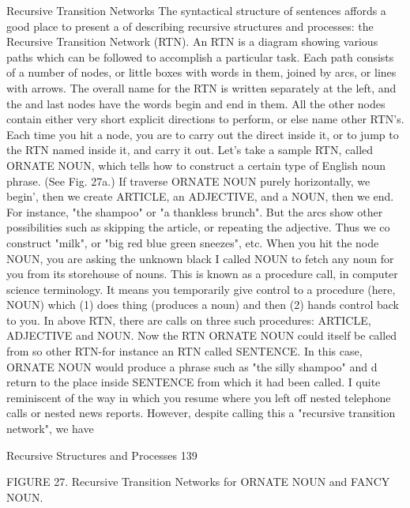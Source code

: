                           Recursive Transition Networks
The syntactical structure of sentences affords a good place to present a of describing
recursive structures and processes: the Recursive Transition Network (RTN). An RTN is
a diagram showing various paths which can be followed to accomplish a particular task.
Each path consists of a number of nodes, or little boxes with words in them, joined by
arcs, or lines with arrows. The overall name for the RTN is written separately at the left,
and the and last nodes have the words begin and end in them. All the other nodes contain
either very short explicit directions to perform, or else name other RTN's. Each time you
hit a node, you are to carry out the direct inside it, or to jump to the RTN named inside it,
and carry it out.
        Let's take a sample RTN, called ORNATE NOUN, which tells how to construct
a certain type of English noun phrase. (See Fig. 27a.) If traverse ORNATE NOUN
purely horizontally, we begin', then we create ARTICLE, an ADJECTIVE, and a
NOUN, then we end. For instance, "the shampoo" or "a thankless brunch". But the arcs
show other possibilities such as skipping the article, or repeating the adjective. Thus we
co construct "milk", or "big red blue green sneezes", etc.
        When you hit the node NOUN, you are asking the unknown black I called NOUN
to fetch any noun for you from its storehouse of nouns. This is known as a procedure
call, in computer science terminology. It means you temporarily give control to a
procedure (here, NOUN) which (1) does thing (produces a noun) and then (2) hands
control back to you. In above RTN, there are calls on three such procedures: ARTICLE,
ADJECTIVE and NOUN. Now the RTN ORNATE NOUN could itself be called from
so other RTN-for instance an RTN called SENTENCE. In this case, ORNATE NOUN
would produce a phrase such as "the silly shampoo" and d return to the place inside
SENTENCE from which it had been called. I quite reminiscent of the way in which you
resume where you left off nested telephone calls or nested news reports.
        However, despite calling this a "recursive transition network", we have




Recursive Structures and Processes                                                       139

FIGURE 27. Recursive Transition Networks for ORNATE NOUN and FANCY NOUN.

